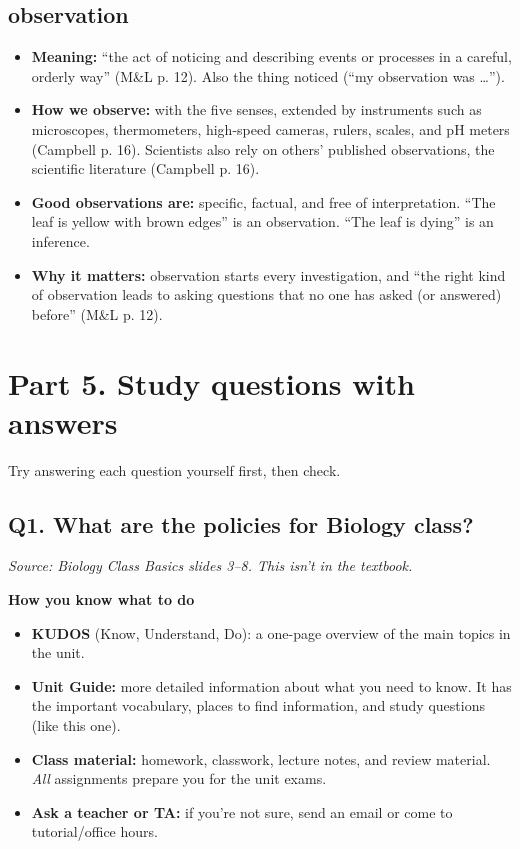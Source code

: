 \documentclass[11pt,letterpaper]{article}
\begin{document}
\subsection{observation}
\begin{itemize}
  \item \textbf{Meaning:} ``the act of noticing and describing events or processes in a careful, orderly way'' (M\&L p. 12). Also the thing noticed (``my observation was \dots{}'').
  \item \textbf{How we observe:} with the five senses, extended by instruments such as microscopes, thermometers, high-speed cameras, rulers, scales, and pH meters (Campbell p. 16). Scientists also rely on others' published observations, the scientific literature (Campbell p. 16).
  \item \textbf{Good observations are:} specific, factual, and free of interpretation. ``The leaf is yellow with brown edges'' is an observation. ``The leaf is dying'' is an inference.
  \item \textbf{Why it matters:} observation starts every investigation, and ``the right kind of observation leads to asking questions that no one has asked (or answered) before'' (M\&L p. 12).
\end{itemize}

\section{Part 5. Study questions with answers}

Try answering each question yourself first, then check.

\subsection{Q1. What are the policies for Biology class?}

\emph{Source: Biology Class Basics slides 3–8. This isn't in the textbook.}

\textbf{How you know what to do}
\begin{itemize}
  \item \textbf{KUDOS} (Know, Understand, Do): a one-page overview of the main topics in the unit.
  \item \textbf{Unit Guide:} more detailed information about what you need to know. It has the important vocabulary, places to find information, and study questions (like this one).
  \item \textbf{Class material:} homework, classwork, lecture notes, and review material. \emph{All} assignments prepare you for the unit exams.
  \item \textbf{Ask a teacher or TA:} if you're not sure, send an email or come to tutorial/office hours.
\end{itemize}
\end{document}
